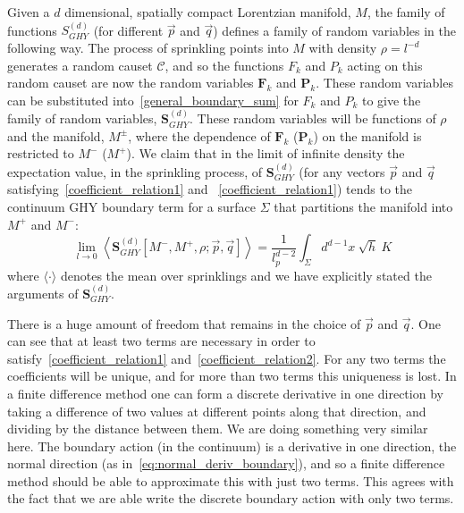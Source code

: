 \documentclass[12pt]{article}
\newcommand{\be}{\begin{equation}}
\newcommand{\ee}{\end{equation}}
\newcommand{\F}[1]{F_{#1}}
\renewcommand{\P}[1]{P_{#1}}
\newcommand{\BF}[1]{\mathbf{F}_{#1}}
\newcommand{\BP}[1]{\mathbf{P}_{#1}}
\begin{document}
Given a $d$ dimensional, spatially compact Lorentzian manifold, $M$, the family of functions $S^{ (d)}_{GHY}$ (for different $\vec{p}$ and $\vec{q}$) defines a family of random variables in the following way. The process of sprinkling points into $M$ with density $\rho=l^{-d}$ generates a random causet $\mathcal{C}$, and so the functions $\F{k}$ and $\P{k}$ acting on this random causet are now the random variables $\BF{k}$ and $\BP{k}$. These random variables can be substituted into~\eqref{general_boundary_sum} for $\F{k}$ and $\P{k}$ to give the family of random variables, $\textbf{S}^{ (d)}_{GHY}$. These random variables will be functions of $\rho$ and the manifold, $M^{\pm}$, where the dependence of $\BF{k}$ ($\BP{k}$) on the manifold is restricted to $M^-$ ($M^+$). We claim that in the limit of infinite density the expectation value, in the sprinkling process, of $\textbf{S}^{ (d)}_{GHY}$ (for any vectors $\vec{p}$ and $\vec{q}$ satisfying~\eqref{coefficient_relation1} and ~\eqref{coefficient_relation1}) tends to the continuum GHY boundary term for a surface $\Sigma$ that partitions the manifold into $M^+$ and $M^-$:
\be
\lim_{l\rightarrow0}\left\langle\textbf{S}^{ (d)}_{GHY}[M^-,M^+,\rho;\vec{p} , \vec{q}]\right\rangle= \frac{1}{l_p^{d-2}}\int_{\Sigma} d^{d-1}x\: \sqrt{h}\: K\label{eq:mainconjecture}
\ee
where $\langle\cdot\rangle$ denotes the mean over sprinklings and we have explicitly stated the arguments of $\textbf{S}^{ (d)}_{GHY}$.

There is a huge amount of freedom that remains in the choice of $\vec{p}$ and $\vec{q}$. One can see that at least two terms are necessary in order to satisfy~\eqref{coefficient_relation1} and~\eqref{coefficient_relation2}. For any two terms the coefficients will be unique, and for more than two terms this uniqueness is lost. In a finite difference method one can form a discrete derivative in one direction by taking a difference of two values at different points along that direction, and dividing by the distance between them. We are doing something very similar here. The boundary action (in the continuum) is a derivative in one direction, the normal direction (as in~\eqref{eq:normal_deriv_boundary}), and so a finite difference method should be able to approximate this with just two terms. This agrees with the fact that we are able write the discrete boundary action with only two terms.
\end{document}
